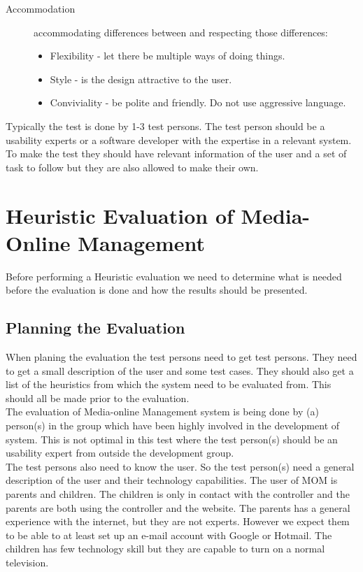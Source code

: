 \begin{description}
\item[Accommodation] accommodating differences between and respecting those differences:
\begin{itemize}
	\item Flexibility - let there be multiple ways of doing things.%
	\item Style - is the design attractive to the user. %
	\item Conviviality - be polite and friendly. Do not use aggressive language.
\end{itemize}
\end{description}

Typically the test is done by 1-3 test persons\citep{HeuristicEvaluation}. The test person should be a usability experts or a software developer with the expertise in a relevant system. To make the test they should have relevant information of the user and a set of task to follow but they are also allowed to make their own.


\section{Heuristic Evaluation of Media-Online Management}
Before performing a Heuristic evaluation we need to determine what is needed before the evaluation is done and how the results should be presented.

\subsection{Planning the Evaluation}
When planing the evaluation the test persons need to get test persons. They need to get a small description of the user and some test cases. They should also get a list of the heuristics from which the system need to be evaluated from. This should all be made prior to the evaluation. \\

The evaluation of Media-online Management system is being done by (a) person(s) in the group which have been highly involved in the development of system. This is not optimal in this test where the test person(s) should be an usability expert from outside the development group.\\

The test persons also need to know the user. So the test person(s) need a general description of the user and their technology capabilities. The user of MOM is parents and children. The children is only in contact with the controller and the parents are both using the controller and the website. The parents has a general experience with the internet, but they are not experts. However we expect them to be able to at least set up an e-mail account with Google or Hotmail. The children has few technology skill but they are capable to turn on a normal television. \\

